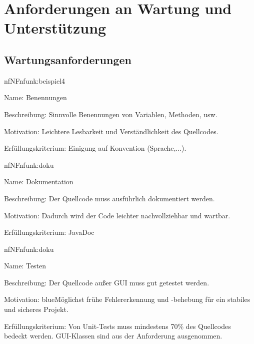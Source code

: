 \section{Anforderungen an Wartung und Unterstützung}

\subsection{Wartungsanforderungen}

\begin{description}[leftmargin=5em, style=sameline]	
	\begin{lhp}{nf}{NF}{nfunk:beispiel4}
		\item [Name:] {Benennungen}
		\item [Beschreibung:] {Sinnvolle Benennungen von Variablen, Methoden, usw.}
		\item [Motivation:] {Leichtere Lesbarkeit und Verständlichkeit des Quellcodes.}
		\item [Erfüllungskriterium:] {Einigung auf Konvention (Sprache,...).}
	\end{lhp}
\end{description}

\begin{description}[leftmargin=5em, style=sameline]	
	\begin{lhp}{nf}{NF}{nfunk:doku}
		\item [Name:] Dokumentation
		\item [Beschreibung:] Der Quellcode muss ausführlich dokumentiert werden.
		\item [Motivation:] {Dadurch wird der Code leichter nachvollziehbar und wartbar.}
		\item [Erfüllungskriterium:] JavaDoc 
	\end{lhp}
\end{description}

\begin{description}[leftmargin=5em, style=sameline]	
	\begin{lhp}{nf}{NF}{nfunk:doku}
		\item [Name:] Testen
		\item [Beschreibung:] Der Quellcode außer GUI muss gut getestet werden.
		\item [Motivation:] {blue}{Möglichst frühe Fehlererkennung und -behebung für ein stabiles und sicheres Projekt. }
		\item [Erfüllungskriterium:] Von Unit-Tests muss mindestens 70\% des Quellcodes bedeckt werden. GUI-Klassen sind aus der Anforderung ausgenommen.
	\end{lhp}
\end{description}


